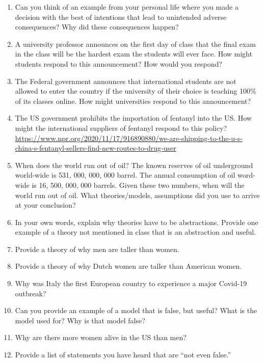 \documentclass[
]{book}
\providecommand{\tightlist}{%
  \setlength{\itemsep}{0pt}\setlength{\parskip}{0pt}}
\begin{document}
\begin{enumerate}
\def\labelenumi{\arabic{enumi}.}
\tightlist
\item
  Can you think of an example from your personal life where you made a decision with the best of intentions that lead to unintended adverse consequences? Why did these consequences happen?
\item
  A university professor announces on the first day of class that the final exam in the class will be the hardest exam the students will ever face. How might students respond to this announcement? How would you respond?\\
\item
  The Federal government announces that international students are not allowed to enter the country if the university of their choice is teaching 100\% of its classes online. How might universities respond to this announcement?
\item
  The US government prohibits the importation of fentanyl into the US. How might the international suppliers of fentanyl respond to this policy?\\
  \url{https://www.npr.org/2020/11/17/916890880/we-are-shipping-to-the-u-s-china-s-fentanyl-sellers-find-new-routes-to-drug-user}
\item
  When does the world run out of oil?
  The known reserves of oil underground world-wide is 531, 000, 000, 000 barrel. The annual consumption of oil word-wide is 16, 500, 000, 000 barrels. Given these two numbers, when will the world run out of oil. What theories/models, assumptions did you use to arrive at your conclusion?
\item
  In your own words, explain why theories have to be abstractions. Provide one example of a theory not mentioned in class that is an abstraction and useful.
\item
  Provide a theory of why men are taller than women.
\item
  Provide a theory of why Dutch women are taller than American women.\\
\item
  Why was Italy the first European country to experience a major Covid-19 outbreak?
\item
  Can you provide an example of a model that is false, but useful? What is the model used for? Why is that model false?
\item
  Why are there more women alive in the US than men?
\item
  Provide a list of statements you have heard that are ``not even false.''
\end{enumerate}
\end{document}
